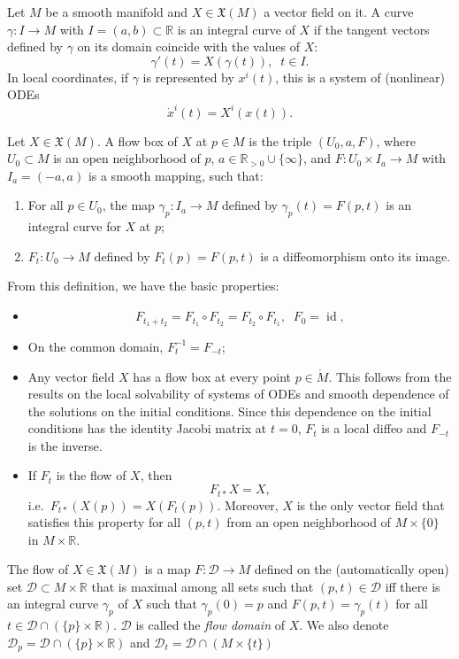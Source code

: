 \documentclass[english,letterpaper]{article}%
\numberwithin{equation}{section}
\numberwithin{figure}{section}
\numberwithin{table}{section}
\theoremstyle{definition}
\theoremstyle{definition}
\theoremstyle{definition}
\theoremstyle{plain}
\theoremstyle{plain}
\theoremstyle{plain}
\theoremstyle{plain}
\theoremstyle{remark}
\theoremstyle{remark}
\DeclareMathOperator{\id}{id}
\newcommand{\fX}{\mathfrak{X}}
\begin{document}
\begin{defn}
Let $M$ be a smooth manifold and $X\in\fX(M)$ a vector field on it. A curve $\gamma:I\to M$ with $I=(a,b)\subset\mathbb{R}$ is an integral curve of $X$ if the tangent vectors defined by $\gamma$ on its domain coincide with the values of $X$: 
\[
\gamma'(t)=X(\gamma(t)),\;\;t\in I.
\]
In local coordinates, if $\gamma$ is represented by $x^i(t)$, this is a system of (nonlinear) ODEs
\[
\dot x^i(t)=X^i(x(t)).
\]
\end{defn}
\begin{defn}
Let $X\in\fX(M)$. A flow box of $X$ at $p\in M$ is the triple $(U_0,a,F)$, where $U_0\subset M$ is an open neighborhood of $p$, $a\in \mathbb{R}_{>0}\cup\{\infty\}$, and $F:U_0\times I_a\to M$ with $I_a=(-a,a)$ is a smooth mapping, such that:
\begin{enumerate}
    \item For all $p\in U_0$, the map $\gamma_p:I_a\to M$ defined by $\gamma_p(t)=F(p,t)$ is an integral curve for $X$ at $p$;
    \item $F_t:U_0\to M$ defined by $F_t(p)=F(p,t)$ is a diffeomorphism onto its image.
\end{enumerate}
\end{defn}
From this definition, we have the basic properties:
\begin{itemize}
    \item \[F_{t_1+t_2}=F_{t_1}\circ F_{t_2}=F_{t_2}\circ F_{t_1}, \;\; F_0=\id,\]
    \item On the common domain, $F_t^{-1}=F_{-t}$;
    \item Any vector field $X$ has a flow box at every point $p\in \mathring{M}$. This follows from the results on the local solvability of systems of ODEs and smooth dependence of the solutions on the initial conditions. Since this dependence on the initial conditions has the identity Jacobi matrix at $t=0$, $F_t$ is a local diffeo and $F_{-t}$ is the inverse.
    \item If $F_t$ is the flow of $X$, then \[F_{t\ast}X=X,\] i.e.\ $F_{t\ast}(X(p))=X(F_t(p))$. Moreover, $X$ is the only vector field that satisfies this property for all $(p,t)$ from an open neighborhood of $M\times\{0\}$ in $M\times\mathbb{R}$.
\end{itemize}

\begin{defn}[Flow]
The flow of $X\in\fX(M)$ is a map $F:\mathcal{D}\to M$ defined on the (automatically open) set $\mathcal{D}\subset M\times \mathbb{R}$ that is maximal among all sets such that $(p,t)\in \mathcal{D}$ iff there is an integral curve $\gamma_p$ of $X$ such that $\gamma_p(0)=p$ and $F(p,t)=\gamma_p(t)$ for all $t\in\mathcal{D}\cap (\{p\}\times\mathbb{R})$. $\mathcal{D}$ is called the \emph{flow domain} of $X$. We also denote $\mathcal{D}_p=\mathcal{D}\cap (\{p\}\times\mathbb{R})$ and $\mathcal{D}_t=\mathcal{D}\cap (M\times\{t\})$
\end{defn}
\end{document}
